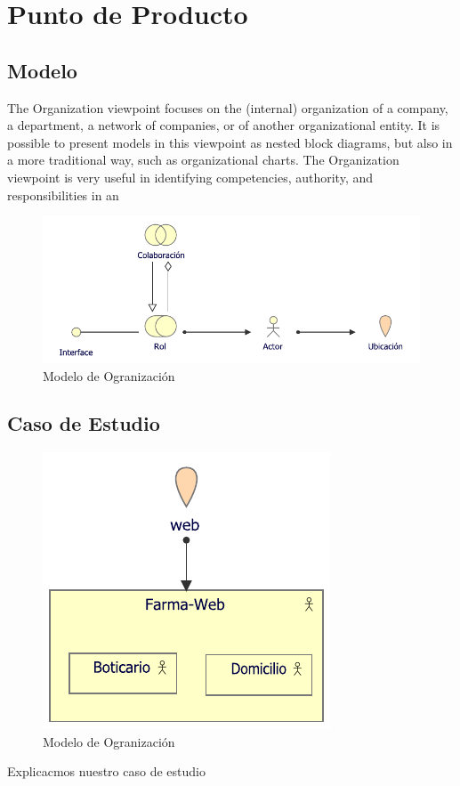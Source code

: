 \section{Punto de Producto}
\subsection{Modelo}
The Organization viewpoint focuses on the (internal) organization of a company, a department, a network of companies, or of another organizational entity. It is possible to present models in this viewpoint as nested block diagrams, but also in a more traditional way, such as organizational charts. The Organization viewpoint is very useful in identifying competencies, authority, and responsibilities in an

\begin{figure}[h!]
	\centering
	\includegraphics[width=1\linewidth]{ARQUITECTURA/imgs/MOrganizacion}
	\caption{Modelo de Ogranización}
\end{figure}


\newpage
\subsection{Caso de Estudio}

\begin{figure}[h!]
	\centering
	\includegraphics[width=.5\linewidth]{ARQUITECTURA/imgs/COrganizacion}
	\caption{Modelo de Ogranización}
\end{figure}
Explicacmos nuestro caso de estudio
\newpage
